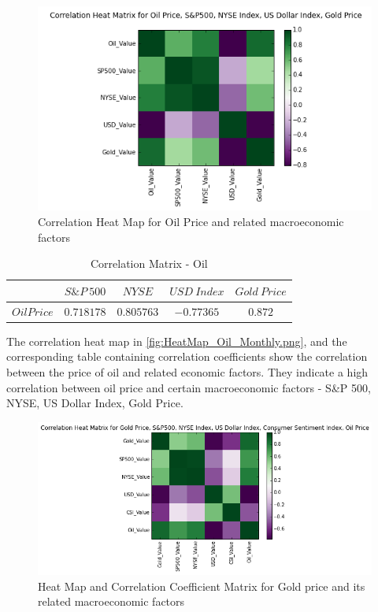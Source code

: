 \documentclass[runningheads]{llncs}
\begin{document}
\begin{figure}
\centering
\includegraphics[width=\textwidth]{HeatMap_Oil_Monthly.png}
\caption{Correlation Heat Map for Oil Price and related macroeconomic factors}
\label{fig:HeatMap_Oil_Monthly.png}
\end{figure}

\begin{table}
\begin{center}
\begin{tabular}{|c|c|c|c|c|}
\hline
$ $ & $ S\&P\ 500 $ & $ NYSE $ & $ USD\ Index $ & $Gold\ Price$ \\ \hline
$Oil Price$ & $0.718178$ & $0.805763$ & $-0.77365$ & $0.872$ \\ \hline
\end{tabular}
\end{center}
\caption{Correlation Matrix - Oil}
\end{table}


The correlation heat map in \autoref{fig:HeatMap_Oil_Monthly.png}, and the corresponding table containing correlation coefficients show the correlation between the price of oil and related economic factors. They indicate a high correlation between oil price and certain macroeconomic factors - S\&P 500, NYSE, US Dollar Index, Gold Price.

\begin{figure}
\centering
\includegraphics[width=\textwidth]{HeatMap_Gold_Monthly.png}
\caption{Heat Map and Correlation Coefficient Matrix for Gold price and its related macroeconomic factors}
\label{fig:HeatMap_Gold_Daily.png}
\end{figure}
\end{document}
